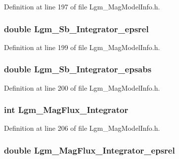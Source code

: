 Definition at line 197 of file Lgm\_\-MagModelInfo.h.\hypertarget{struct_lgm___mag_model_info_f26880c2615c83b542f39feab78bf592}{
\subsubsection[{Lgm\_\-Sb\_\-Integrator\_\-epsrel}]{\setlength{\rightskip}{0pt plus 5cm}double {\bf Lgm\_\-Sb\_\-Integrator\_\-epsrel}}}
\label{struct_lgm___mag_model_info_f26880c2615c83b542f39feab78bf592}




Definition at line 199 of file Lgm\_\-MagModelInfo.h.\hypertarget{struct_lgm___mag_model_info_128e371c7ac1d69077ca45eb79cc094e}{
\subsubsection[{Lgm\_\-Sb\_\-Integrator\_\-epsabs}]{\setlength{\rightskip}{0pt plus 5cm}double {\bf Lgm\_\-Sb\_\-Integrator\_\-epsabs}}}
\label{struct_lgm___mag_model_info_128e371c7ac1d69077ca45eb79cc094e}




Definition at line 200 of file Lgm\_\-MagModelInfo.h.\hypertarget{struct_lgm___mag_model_info_0ba66db9846f0a3c1c41abe473719dcb}{
\subsubsection[{Lgm\_\-MagFlux\_\-Integrator}]{\setlength{\rightskip}{0pt plus 5cm}int {\bf Lgm\_\-MagFlux\_\-Integrator}}}
\label{struct_lgm___mag_model_info_0ba66db9846f0a3c1c41abe473719dcb}




Definition at line 206 of file Lgm\_\-MagModelInfo.h.\hypertarget{struct_lgm___mag_model_info_c15192e0cdb8a093d53b3aed95fd5899}{
\subsubsection[{Lgm\_\-MagFlux\_\-Integrator\_\-epsrel}]{\setlength{\rightskip}{0pt plus 5cm}double {\bf Lgm\_\-MagFlux\_\-Integrator\_\-epsrel}}}
\label{struct_lgm___mag_model_info_c15192e0cdb8a093d53b3aed95fd5899}




